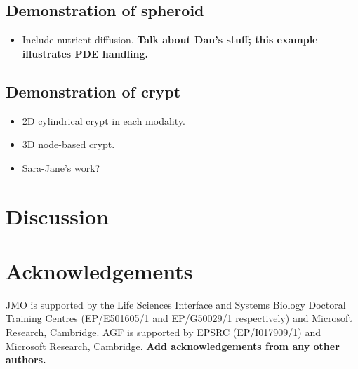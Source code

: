 \documentclass{siamltex}
\newcommand{\highlight}[1]{{\color{red} \bf{#1}}}
\begin{document}
\subsection{Demonstration of spheroid} \label{sec:spheroid}
\begin{itemize}
 \item Include nutrient diffusion. \highlight{Talk about Dan's stuff; this example illustrates PDE handling.}
\end{itemize}

\subsection{Demonstration of crypt} \label{sec:crypt}
\begin{itemize}
  \item 2D cylindrical crypt in each modality. 
  \item 3D node-based crypt.
  \item Sara-Jane's work?
\end{itemize}


\section{Discussion} \label{sec:discussion}

\section*{Acknowledgements}

JMO is supported by the Life Sciences Interface and Systems Biology Doctoral Training Centres (EP/E501605/1 and EP/G50029/1 respectively) and Microsoft Research, Cambridge. 
AGF is supported by EPSRC (EP/I017909/1) and Microsoft Research, Cambridge. 
\highlight{Add acknowledgements from any other authors.}

\clearpage

{}

\end{document}
